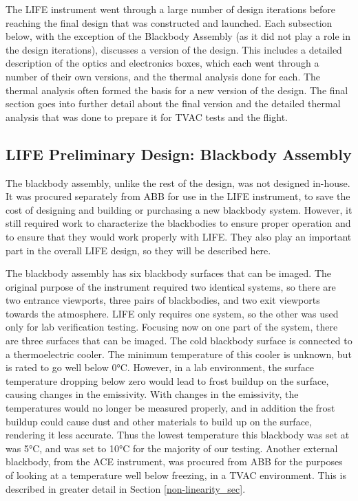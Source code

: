 The LIFE instrument went through a large number of design iterations before reaching the final design that was constructed and launched. Each subsection below, with the exception of the Blackbody Assembly (as it did not play a role in the design iterations), discusses a version of the design. This includes a detailed description of the optics and electronics boxes, which each went through a number of their own versions, and the thermal analysis done for each. The thermal analysis often formed the basis for a new version of the design. The final section goes into further detail about the final version and the detailed thermal analysis that was done to prepare it for TVAC tests and the flight.

\subsection{LIFE Preliminary Design: Blackbody Assembly}\label{blackbody_assem_sec}
The blackbody assembly, unlike the rest of the design, was not designed in-house. It was procured separately from ABB for use in the LIFE instrument, to save the cost of designing and building or purchasing a new blackbody system. However, it still required work to characterize the blackbodies to ensure proper operation and to ensure that they would work properly with LIFE. They also play an important part in the overall LIFE design, so they will be described here.

The blackbody assembly has six blackbody surfaces that can be imaged. The original purpose of the instrument required two identical systems, so there are two entrance viewports, three pairs of blackbodies, and two exit viewports towards the atmosphere. LIFE only requires one system, so the other was used only for lab verification testing. Focusing now on one part of the system, there are three surfaces that can be imaged. The cold blackbody surface is connected to a thermoelectric cooler. The minimum temperature of this cooler is unknown, but is rated to go well below 0°C. However, in a lab environment, the surface temperature dropping below zero would lead to frost buildup on the surface, causing changes in the emissivity. With changes in the emissivity, the temperatures would no longer be measured properly, and in addition the frost buildup could cause dust and other materials to build up on the surface, rendering it less accurate. Thus the lowest temperature this blackbody was set at was 5°C, and was set to 10°C for the majority of our testing. Another external blackbody, from the ACE instrument, was procured from ABB for the purposes of looking at a temperature well below freezing, in a TVAC environment. This is described in greater detail in Section \ref{non-linearity_sec}. 

